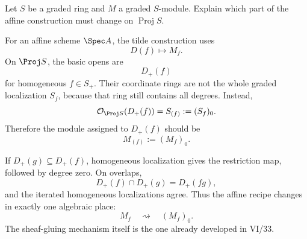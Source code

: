 \begin{problem}\label{prob:vi33-12}
Let \(S\) be a graded ring and \(M\) a graded \(S\)-module. Explain which part of the affine construction must change
on \(\operatorname{Proj}S\).
\end{problem}

\ifdefined\FullProblemDossiers
\begin{solution}
For an affine scheme \(\Spec A\), the tilde construction uses
\[
D(f)\longmapsto M_f.
\]
On \(\Proj S\), the basic opens are
\[
D_+(f)
\]
for homogeneous \(f\in S_+\). Their coordinate rings are not the whole graded localization \(S_f\), because that
ring still contains all degrees.  Instead,
\[
\mathcal O_{\Proj S}(D_+(f))
=
S_{(f)}
:=
(S_f)_0.
\]
Therefore the module assigned to \(D_+(f)\) should be
\[
M_{(f)}
:=
(M_f)_0.
\]

If \(D_+(g)\subseteq D_+(f)\), homogeneous localization gives the restriction map, followed by degree zero.
On overlaps,
\[
D_+(f)\cap D_+(g)=D_+(fg),
\]
and the iterated homogeneous localizations agree.  Thus the affine recipe changes in exactly one algebraic place:
\[
\boxed{
M_f\quad\rightsquigarrow\quad(M_f)_0.
}
\]
The sheaf-gluing mechanism itself is the one already developed in VI/33.
\end{solution}
\fi
